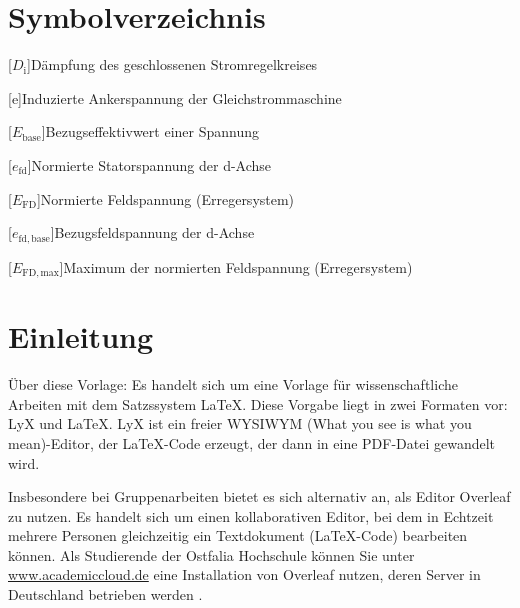 \chapter*{Symbolverzeichnis}

\begin{multicols}{2}
\raggedcolumns 
\begin{acronym}[aaaaaaaa]
\setlength{\itemsep}{-\parsep}

[$D_{\mathrm{i}}$]{Dämpfung des geschlossenen Stromregelkreises}

[e]{Induzierte Ankerspannung der Gleichstrommaschine}{}

[$E_{\mathrm{base}}$]{Bezugseffektivwert einer Spannung}

[$e_{\mathrm{fd}}$]{Normierte Statorspannung der d-Achse}

[$E_{\mathrm{FD}}$]{Normierte Feldspannung (Erregersystem)}

[$e_{\mathrm{fd,base}}$]{Bezugsfeldspannung der d-Achse}

[$E_{\mathrm{FD,max}}$]{Maximum der normierten Feldspannung
(Erregersystem)}

\end{acronym}
\end{multicols} 

\listoftables

\lstlistoflistings

\listoffigures


\chapter{Einleitung}

 Über diese Vorlage: Es handelt sich um eine
Vorlage für wissenschaftliche Arbeiten mit dem Satzssystem LaTeX.
Diese Vorgabe liegt in zwei Formaten vor: LyX und LaTeX. LyX ist ein
freier WYSIWYM (What you see is what you mean)-Editor, der LaTeX-Code
erzeugt, der dann in eine PDF-Datei gewandelt wird. 

Insbesondere bei Gruppenarbeiten bietet es sich alternativ an, als
Editor Overleaf zu nutzen. Es handelt sich um einen kollaborativen
Editor, bei dem in Echtzeit mehrere Personen gleichzeitig ein Textdokument
(LaTeX-Code) bearbeiten können. Als Studierende der Ostfalia Hochschule
können Sie unter \url{www.academiccloud.de} eine Installation von
Overleaf nutzen, deren Server in Deutschland betrieben werden .

